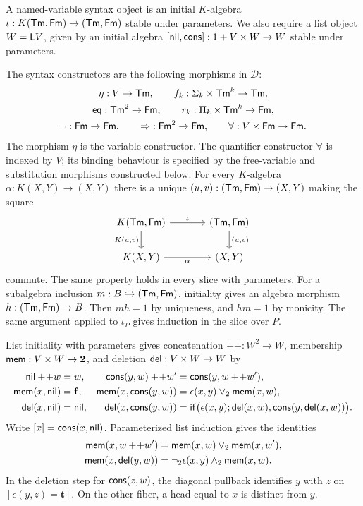 \begin{definition}\label{def:categorical-syntax}
A named-variable syntax object is an initial $K$-algebra
$\iota:K(\mathsf{Tm},\mathsf{Fm})\to(\mathsf{Tm},\mathsf{Fm})$ stable under parameters.
We also require a list object $W=\mathsf L V$, given by an initial
algebra $[\mathsf{nil},\mathsf{cons}]:1+V\times W\to W$ stable under parameters.
\end{definition}

The syntax constructors are the following morphisms in $\mathcal D$:
\begin{gather*}
 \eta:V\to\mathsf{Tm},\qquad f_k:\Sigma_k\times\mathsf{Tm}^k\to\mathsf{Tm},\\
 {\mathsf{eq}}:\mathsf{Tm}^2\to\mathsf{Fm},\qquad
 r_k:\Pi_k\times\mathsf{Tm}^k\to\mathsf{Fm},\\
 \neg:\mathsf{Fm}\to\mathsf{Fm},\qquad
 {\Rightarrow}:\mathsf{Fm}^2\to\mathsf{Fm},\qquad
 {\forall}:V\times\mathsf{Fm}\to\mathsf{Fm}.
\end{gather*}
The morphism $\eta$ is the variable constructor.
The quantifier constructor $\forall$ is indexed
by $V$; its binding behaviour is specified by the free-variable and
substitution morphisms constructed below.
For every $K$-algebra $\alpha:K(X,Y)\to(X,Y)$ there is a unique
$(u,v):(\mathsf{Tm},\mathsf{Fm})\to(X,Y)$ making the square
\[
\begin{tikzcd}[column sep=large]
 K(\Tm,\Fm)\arrow[r,"\iota"]\arrow[d,"{K(u,v)}"'] &
 (\Tm,\Fm)\arrow[d,"{(u,v)}"]\\
 K(X,Y)\arrow[r,"\alpha"'] & (X,Y)
\end{tikzcd}
\]
commute. The same property holds in every slice with parameters.
For a subalgebra inclusion $m:B\hookrightarrow(\mathsf{Tm},\mathsf{Fm})$,
initiality gives an algebra morphism $h:(\mathsf{Tm},\mathsf{Fm})\to B$.
Then $mh=1$ by uniqueness, and $hm=1$ by monicity. The same
argument applied to $\iota_P$ gives induction in the slice over $P$.

List initiality with parameters gives concatenation
$+\!+:W^2\to W$, membership $\mathsf{mem}:V\times W\to\mathbf 2$, and
deletion $\mathsf{del}:V\times W\to W$ by
\begin{align*}
 \mathsf{nil}+\!+w&=w,&
 \mathsf{cons}(y,w)+\!+w'&=\mathsf{cons}(y,w+\!+w'),\\
 \mathsf{mem}(x,\mathsf{nil})&=\mathbf{f},&
 \mathsf{mem}(x,\mathsf{cons}(y,w))&=\epsilon(x,y)\vee_2\mathsf{mem}(x,w),\\
 \mathsf{del}(x,\mathsf{nil})&=\mathsf{nil},&
 \mathsf{del}(x,\mathsf{cons}(y,w))&=
 \mathsf{if}\bigl(\epsilon(x,y);\mathsf{del}(x,w),
                         \mathsf{cons}(y,\mathsf{del}(x,w))\bigr).
\end{align*}
Write $[x]=\mathsf{cons}(x,\mathsf{nil})$.
Parameterized list induction gives the identities
\begin{align*}
 \mathsf{mem}(x,w+\!+w')&=\mathsf{mem}(x,w)\vee_2\mathsf{mem}(x,w'),\\
 \mathsf{mem}(x,\mathsf{del}(y,w))&=\neg_2\epsilon(x,y)\wedge_2\mathsf{mem}(x,w).
\end{align*}
In the deletion step for $\mathsf{cons}(z,w)$, the diagonal pullback identifies
$y$ with $z$ on $[\epsilon(y,z)=\mathbf t]$. On the other fiber, a
head equal to $x$ is distinct from $y$.

